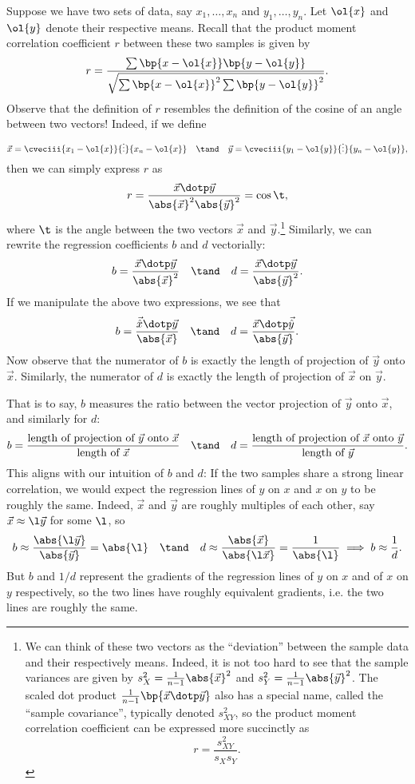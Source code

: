 Suppose we have two sets of data, say $x_1, \dots, x_n$ and $y_1, \dots, y_n$. Let $\ol{x}$ and $\ol{y}$ denote their respective means. Recall that the product moment correlation coefficient $r$ between these two samples is given by \[r = \frac{\sum \bp{x - \ol{x}} \bp{y - \ol{y}}}{\sqrt{\sum \bp{x - \ol{x}}^2 \sum \bp{y - \ol{y}}^2}}.\] Observe that the definition of $r$ resembles the definition of the cosine of an angle between two vectors! Indeed, if we define \[\vec x = \cveciii{x_1 - \ol{x}}{\vdots}{x_n - \ol{x}} \quad \tand \quad \vec y = \cveciii{y_1 - \ol{y}}{\vdots}{y_n - \ol{y}},\] then we can simply express $r$ as \[r = \frac{\vec x \dotp \vec y}{\abs{\vec x}^2 \abs{\vec y}^2} = \cos \t,\] where $\t$ is the angle between the two vectors $\vec x$ and $\vec y$.\footnote{We can think of these two vectors as the ``deviation'' between the sample data and their respectively means. Indeed, it is not too hard to see that the sample variances are given by $s_X^2 = \frac1{n-1} \abs{\vec x}^2$ and $s_Y^2 = \frac1{n-1} \abs{\vec y}^2$. The scaled dot product $\frac1{n-1} \bp{\vec x \dotp \vec y}$ also has a special name, called the ``sample covariance'', typically denoted $s_{XY}^2$, so the product moment correlation coefficient can be expressed more succinctly as \[r = \frac{s_{XY}^2}{s_X s_Y}.\]} Similarly, we can rewrite the regression coefficients $b$ and $d$ vectorially: \[b = \frac{\vec x \dotp \vec y}{\abs{\vec x}^2} \quad \tand \quad d = \frac{\vec x \dotp \vec y}{\abs{\vec y}^2}.\] If we manipulate the above two expressions, we see that \[b = \frac{\vec{\hat x} \dotp \vec y}{\abs{\vec x}} \quad \tand \quad d = \frac{\vec x \dotp \vec{\hat{y}}}{\abs{\vec y}}.\] Now observe that the numerator of $b$ is exactly the length of projection of $\vec y$ onto $\vec x$. Similarly, the numerator of $d$ is exactly the length of projection of $\vec x$ on $\vec y$.

That is to say, $b$ measures the ratio between the vector projection of $\vec y$ onto $\vec x$, and similarly for $d$: \[b = \frac{\text{length of projection of $\vec y$ onto $\vec x$}}{\text{length of $\vec x$}} \quad \tand \quad d = \frac{\text{length of projection of $\vec x$ onto $\vec y$}}{\text{length of $\vec y$}}.\] This aligns with our intuition of $b$ and $d$: If the two samples share a strong linear correlation, we would expect the regression lines of $y$ on $x$ and $x$ on $y$ to be roughly the same. Indeed, $\vec x$ and $\vec y$ are roughly multiples of each other, say $\vec x \approx \l \vec y$ for some $\l$, so \[b \approx \frac{\abs{\l \vec y}}{\abs{\vec y}} = \abs{\l} \quad \tand \quad d \approx \frac{\abs{\vec x}}{\abs{\l \vec x}} = \frac1{\abs{\l}} \implies b \approx \frac1{d}.\] But $b$ and $1/d$ represent the gradients of the regression lines of $y$ on $x$ and of $x$ on $y$ respectively, so the two lines have roughly equivalent gradients, i.e. the two lines are roughly the same.